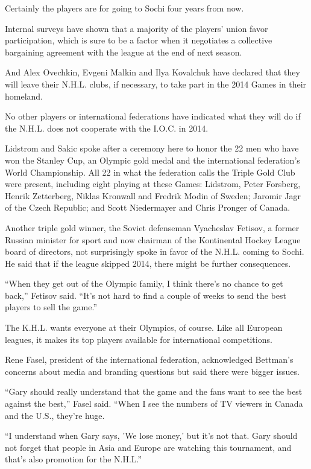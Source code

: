 ﻿\documentclass[12pt]{article}
\begin{document}
Certainly the players are for going to Sochi four years from now.

Internal surveys have shown that a majority of the players' union favor participation, which is sure
to be a factor when it negotiates a collective bargaining agreement with the league at the end of
next season.

And Alex Ovechkin, Evgeni Malkin and Ilya Kovalchuk have declared that they will leave their N.H.L.
clubs, if necessary, to take part in the 2014 Games in their homeland.

No other players or international federations have indicated what they will do if the N.H.L. does
not cooperate with the I.O.C. in 2014.

Lidstrom and Sakic spoke after a ceremony here to honor the 22 men who have won the Stanley Cup, an
Olympic gold medal and the international federation's World Championship. All 22 in what the
federation calls the Triple Gold Club were present, including eight playing at these Games:
Lidstrom, Peter Forsberg, Henrik Zetterberg, Niklas Kronwall and Fredrik Modin of Sweden; Jaromir
Jagr of the Czech Republic; and Scott Niedermayer and Chris Pronger of Canada.

Another triple gold winner, the Soviet defenseman Vyacheslav Fetisov, a former Russian minister for
sport and now chairman of the Kontinental Hockey League board of directors, not surprisingly spoke
in favor of the N.H.L. coming to Sochi. He said that if the league skipped 2014, there might be
further consequences.

``When they get out of the Olympic family, I think there's no chance to get back,'' Fetisov said.
``It's not hard to find a couple of weeks to send the best players to sell the game.''

The K.H.L. wants everyone at their Olympics, of course. Like all European leagues, it makes its top
players available for international competitions.

Rene Fasel, president of the international federation, acknowledged Bettman's concerns about media
and branding questions but said there were bigger issues.

``Gary should really understand that the game and the fans want to see the best against the best,''
Fasel said. ``When I see the numbers of TV viewers in Canada and the U.S., they're huge.

``I understand when Gary says, 'We lose money,' but it's not that. Gary should not forget that
people in Asia and Europe are watching this tournament, and that's also promotion for the N.H.L.''
\end{document}
